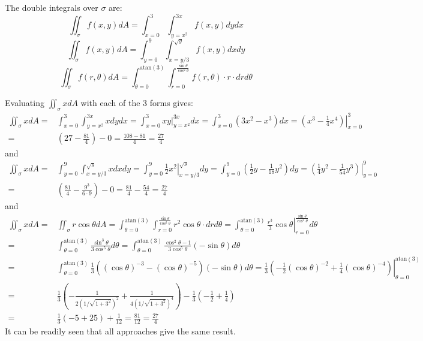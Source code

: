 \documentclass{article}
\newcommand{\atan}{\text{atan}}
\newcommand{\at}[1]{\left. #1 \right|}
\newcommand{\dr}[1]{\textcolor{dark_red}{#1}}
\begin{document}
\dr{
The double integrals over \(\sigma\) are:
\[\iint_{\sigma} f(x,y)dA = \int_{x = 0}^3 \int_{y = x^2}^{3x} f(x,y)dydx\]
\[\iint_{\sigma} f(x,y)dA = \int_{y = 0}^9 \int_{x = y/3}^{\sqrt{y}} f(x,y)dxdy\]
\[\iint_{\sigma} f(r,\theta)dA = \int_{\theta = 0}^{\atan(3)} \int_{r = 0}^{\frac{\sin\theta}{\cos^2\theta}} f(r,\theta) \cdot r \cdot drd\theta\]
}

\dr{Evaluating \(\iint_{\sigma} x dA\) with each of the 3 forms gives:
\begin{align*}
\iint_{\sigma} x dA = & \int_{x = 0}^3 \int_{y = x^2}^{3x} x dydx 
= \int_{x = 0}^3 \at{xy}_{y = x^2}^{3x} dx 
= \int_{x = 0}^3 (3x^2 - x^3)dx 
= \at{(x^3 - \frac{1}{4}x^4)}_{x = 0}^3 \\
= & (27 - \frac{81}{4}) - 0 
= \frac{108 - 81}{4}
= \frac{27}{4}
\end{align*}
and
\begin{align*}
\iint_{\sigma} x dA = & \int_{y = 0}^9 \int_{x = y/3}^{\sqrt{y}} x dxdy 
= \int_{y = 0}^9 \at{\frac{1}{2}x^2}_{x = y/3}^{\sqrt{y}} dy 
= \int_{y = 0}^9 (\frac{1}{2}y - \frac{1}{18}y^2)dy 
= \at{(\frac{1}{4}y^2 - \frac{1}{54}y^3)}_{y = 0}^9 \\
= & (\frac{81}{4} - \frac{9^3}{6 \cdot 9}) - 0
= \frac{81}{4} - \frac{54}{4} 
= \frac{27}{4}
\end{align*}
and
\begin{align*}
\iint_{\sigma} x dA = & \iint_{\sigma} r\cos\theta dA 
= \int_{\theta = 0}^{\atan(3)} \int_{r = 0}^{\frac{\sin\theta}{\cos^2\theta}} r^2\cos\theta \cdot drd\theta 
= \int_{\theta = 0}^{\atan(3)} \at{\frac{r^3}{3}\cos\theta}_{r = 0}^{\frac{\sin\theta}{\cos^2\theta}}d\theta \\
= & \int_{\theta = 0}^{\atan(3)} \frac{\sin^3\theta}{3\cos^5\theta} d\theta 
= \int_{\theta = 0}^{\atan(3)} \frac{\cos^2\theta - 1}{3\cos^5\theta} (-\sin\theta)d\theta \\
= & \int_{\theta = 0}^{\atan(3)} \frac{1}{3}((\cos\theta)^{-3} - (\cos\theta)^{-5})(-\sin\theta)d\theta 
= \at{\frac{1}{3}(-\frac{1}{2}(\cos\theta)^{-2} + \frac{1}{4}(\cos\theta)^{-4})}_{\theta = 0}^{\atan(3)} \\
= & \frac{1}{3}(-\frac{1}{2(1/\sqrt{1 + 3^2})^2} + \frac{1}{4(1/\sqrt{1 + 3^2})^4}) - \frac{1}{3}(-\frac{1}{2} + \frac{1}{4}) \\
= & \frac{1}{3}(-5 + 25) + \frac{1}{12} 
= \frac{81}{12} 
= \frac{27}{4}
\end{align*}
It can be readily seen that all approaches give the same result.
}
\end{document}
